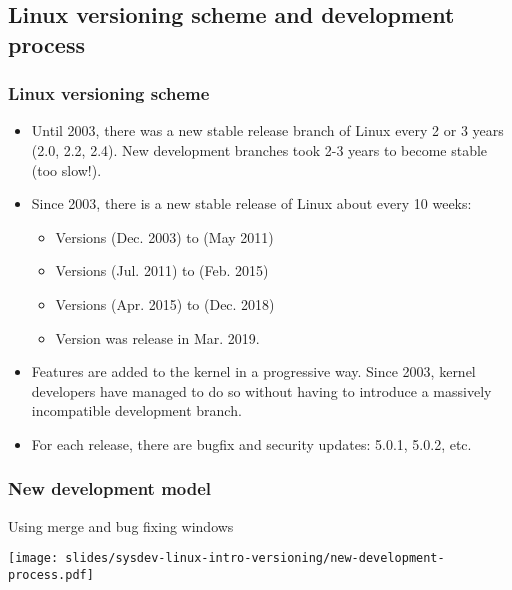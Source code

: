 \subsection{Linux versioning scheme and development process}

\begin{frame}
  \frametitle{Linux versioning scheme}
  \begin{itemize}
  \item Until 2003, there was a new stable release branch of Linux every
        2 or 3 years (2.0, 2.2, 2.4). New development branches took 2-3
        years to become stable (too slow!).
  \item Since 2003, there is a new stable release of Linux about every
	10 weeks:
  \begin{itemize}
	\item Versions  (Dec. 2003) to  (May 2011)
	\item Versions  (Jul. 2011) to  (Feb. 2015)
	\item Versions  (Apr. 2015) to  (Dec. 2018)
	\item Version  was release in Mar. 2019.
  \end{itemize}
  \item Features are added to the kernel in a progressive way. Since
        2003, kernel developers have managed to do so without having
        to introduce a massively incompatible development branch.
  \item For each release, there are bugfix and security updates:
    5.0.1, 5.0.2, etc.
  \end{itemize}
\end{frame}

\begin{frame}
  \frametitle{New development model}
  Using merge and bug fixing windows
  \begin{center}
    \texttt{[image: slides/sysdev-linux-intro-versioning/new-development-process.pdf]}
  \end{center}
\end{frame}

